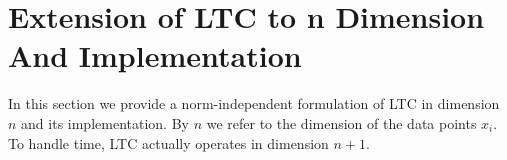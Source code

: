 \chapter{Extension of LTC to n Dimension And Implementation}


In this section we provide a norm-independent formulation of LTC in dimension
$n$ and its implementation. By $n$ we refer to the dimension of the data points $x_i$. To handle time,
LTC actually operates in dimension $n+1$. 





